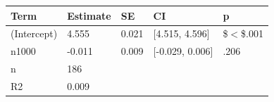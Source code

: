 \begin{table}[ht]
\centering
\begingroup\footnotesize
\begin{tabular}{lllll}
  \toprule
Term & Estimate & SE & CI & p \\ 
  \midrule
(Intercept) & 4.555 & 0.021 & [4.515, 4.596] & \$$<$\$.001 \\ 
  n1000 & -0.011 & 0.009 & [-0.029, 0.006] & .206 \\ 
  n & 186 &  &  &  \\ 
  R2 & 0.009 &  &  &  \\ 
   \bottomrule
\end{tabular}
\endgroup
\end{table}
